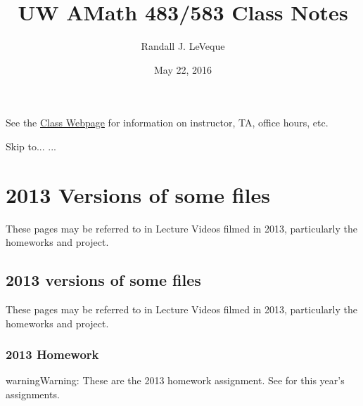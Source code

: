 \documentclass[letterpaper,10pt,english]{sphinxmanual}
\title{UW AMath 483/583 Class Notes}
\date{May 22, 2016}
\author{Randall J. LeVeque}
\begin{document}
\maketitle
\tableofcontents
{}\label{index::doc}


See the \href{http://faculty.washington.edu/rjl/classes/am583s2014/index.html}{Class Webpage}
for information on instructor, TA, office hours, etc.

Skip to...  ... 



\chapter{2013 Versions of some files}
\label{index:versions-of-some-files}\label{index:contents-of-class-notes-for-amath-483-583}
These pages may be referred to in Lecture Videos filmed in 2013,
particularly the homeworks and project.


\section{2013 versions of some files}
\label{2013/index:versions-of-some-files}\label{2013/index::doc}\label{2013/index:id1}
These pages may be referred to in Lecture Videos filmed in 2013,
particularly the homeworks and project.


\subsection{2013 Homework}
\label{2013/homeworks:homeworks}\label{2013/homeworks::doc}\label{2013/homeworks:homework}
\begin{notice}{warning}{Warning:}
These are the 2013 homework assignment.
See {\hyperref[homeworks:homeworks]{}} for this year's assignments.
\end{notice}
\end{document}
